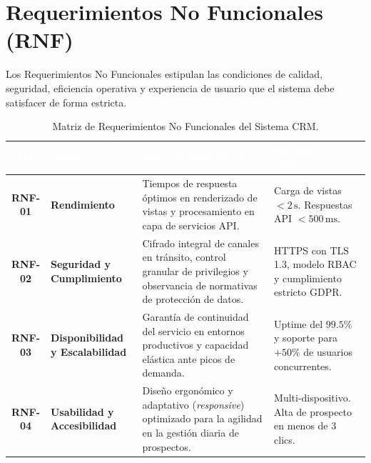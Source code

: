 \documentclass[11pt,a4paper]{article}
\begin{document}
\newpage

\section{Requerimientos No Funcionales (RNF)}

Los Requerimientos No Funcionales estipulan las condiciones de calidad, seguridad, eficiencia operativa y experiencia de usuario que el sistema debe satisfacer de forma estricta.

\vspace{0.3cm}
\begin{table}[h]
    \centering
    \sffamily\small
    \renewcommand{\arraystretch}{1.4}
    \begin{tabularx}{\textwidth}{c >{\raggedright\arraybackslash}p{2.8cm} >{\raggedright\arraybackslash}X >{\raggedright\arraybackslash}p{3.8cm}}
        \toprule
        \rowcolor{PrimaryNavy}
        \textcolor{white}{\textbf{ID}} & 
        \textcolor{white}{\textbf{Categoría}} & 
        \textcolor{white}{\textbf{Especificación Técnica}} & 
        \textcolor{white}{\textbf{Métrica / Criterio}} \\
        \midrule
        \rowcolor{BgSoftGray}
        \textbf{RNF-01} & 
        \textbf{Rendimiento} & 
        Tiempos de respuesta óptimos en renderizado de vistas y procesamiento en capa de servicios API. & 
        Carga de vistas $< 2\,\text{s}$. \newline Respuestas API $< 500\,\text{ms}$. \\
        
        \textbf{RNF-02} & 
        \textbf{Seguridad y Cumplimiento} & 
        Cifrado integral de canales en tránsito, control granular de privilegios y observancia de normativas de protección de datos. & 
        HTTPS con TLS 1.3, modelo RBAC y cumplimiento estricto GDPR. \\
        
        \rowcolor{BgSoftGray}
        \textbf{RNF-03} & 
        \textbf{Disponibilidad y Escalabilidad} & 
        Garantía de continuidad del servicio en entornos productivos y capacidad elástica ante picos de demanda. & 
        Uptime del $99.5\%$ y soporte para $+50\%$ de usuarios concurrentes. \\
        
        \textbf{RNF-04} & 
        \textbf{Usabilidad y Accesibilidad} & 
        Diseño ergonómico y adaptativo (\textit{responsive}) optimizado para la agilidad en la gestión diaria de prospectos. & 
        Multi-dispositivo. Alta de prospecto en menos de $3$ clics. \\
        \bottomrule
    \end{tabularx}
    \caption{Matriz de Requerimientos No Funcionales del Sistema CRM.}
    \label{tab:rnf}
\end{table}
\end{document}
